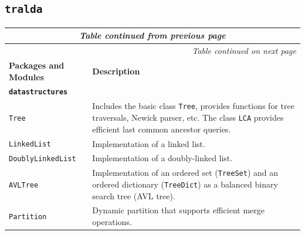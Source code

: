 \documentclass[hidelinks,11pt]{article}
\begin{document}
\subsection{\texttt{tralda}}

{\footnotesize
  \setlength{\tabcolsep}{6pt}
  \renewcommand{\arraystretch}{1.4}
  \begin{longtable}{| p{4.0cm} | p{10cm} |}
    \endfirsthead
    \multicolumn{2}{c}{\textit{Table continued from previous page}}\\
    \hline
    \endhead
    \hline \multicolumn{2}{r}{\textit{Table continued on next page}} \\
    \endfoot
    \hline
    \endlastfoot
    \hline
    \textbf{Packages and Modules} & \textbf{Description} \\
    \hline
    \multicolumn{2}{|l|}{\textbf{\texttt{datastructures}}}\\
    \hline
    \texttt{Tree} &
    Includes the basic class \texttt{Tree}, provides functions for tree 
    traversals, Newick parser, etc. The class \texttt{LCA} provides efficient 
    last common ancestor queries.\\
    \texttt{LinkedList} &
    Implementation of a linked list. \\
    \texttt{DoublyLinkedList} &
    Implementation of a doubly-linked list. \\
    \texttt{AVLTree} &
    Implementation of an ordered set (\texttt{TreeSet}) and an ordered 
    dictionary 
    (\texttt{TreeDict}) as a balanced binary search tree (AVL tree). \\
    \texttt{Partition} &
    Dynamic partition that supports efficient merge operations. \\

\end{longtable}}
\end{document}
